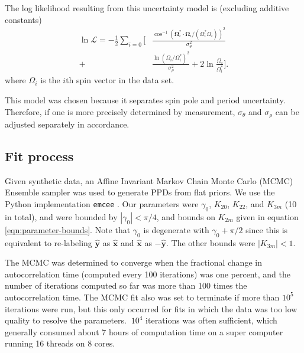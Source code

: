 \documentclass[fleqn,usenatbib]{mnras}
\newcommand{\unit}[1]{\bm{\hat{#1}}}
\newcommand{\parens}[1]{\left( #1 \right)}
\begin{document}
The log likelihood resulting from this uncertainty model is (excluding additive constants)
\begin{equation}
  \begin{split}
  \ln \mathcal{L} = -\frac{1}{2}\sum_{i = 0}\Bigg[&\frac{\cos^{-1} (\bm \Omega_i^* \cdot \bm \Omega_i/(\Omega_i^* \Omega_i))^2}{\sigma_\theta^2}\\
  +&\frac{\ln \parens{\Omega_i /\Omega_i^*}^2}{\sigma_\rho^2} + 2\ln\frac{\Omega_i}{\Omega_i^*}\Bigg].
  \end{split}
  \label{eqn:log-likelihood}
\end{equation}
where $\Omega_i$ is the $i$th spin vector in the data set.

This model was chosen because it separates spin pole and period uncertainty. Therefore, if one is more precisely determined by measurement, $\sigma_\theta$ and $\sigma_\rho$ can be adjusted separately in accordance.





\subsection{Fit process}
\label{sec:fit}
Given synthetic data, an Affine Invariant Markov Chain Monte Carlo (MCMC) Ensemble sampler was used to generate PPDs from flat priors. We use the Python implementation \texttt{emcee} \cite{foreman2013emcee}. Our parameters were $\gamma_0$, $K_{20}$, $K_{22}$, and $K_{3m}$ (10 in total), and were bounded by $|\gamma_0| < \pi/4$, and bounds on $K_{2 m}$ given in equation \ref{eqn:parameter-bounds}. Note that $\gamma_0$ is degenerate with $\gamma_0 + \pi/2$ since this is equivalent to re-labeling $\unit y$ as $\unit x$ and $\unit x$ as $-\unit y$. The other bounds were $|K_{3m}| < 1$.

The MCMC was determined to converge when the fractional change in autocorrelation time (computed every 100 iterations) was one percent, and the number of iterations computed so far was more than 100 times the autocorrelation time. The MCMC fit also was set to terminate if more than $10^5$ iterations were run, but this only occurred for fits in which the data was too low quality to resolve the parameters. $~10^4$ iterations was often sufficient, which generally consumed about 7 hours of computation time on a super computer running 16 threads on 8 cores.
\end{document}
